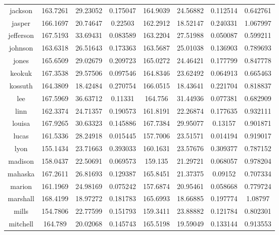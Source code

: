 \begin{table}[H]
\begin{tabular}{|c|ccc|ccc|c|}
jackson       & 163.7261 & 29.23052       & 0.175047 & 164.9039 & 24.56882       & 0.112514 & 0.642761 \\
jasper        & 166.1697 & 20.74647       & 0.22503  & 162.2912 & 18.52147       & 0.240331 & 1.067997 \\
jefferson     & 167.5193 & 33.69431       & 0.083589 & 163.2204 & 27.51988       & 0.050087 & 0.599211 \\
johnson       & 163.6318 & 26.51643       & 0.173363 & 163.5687 & 25.01038       & 0.136903 & 0.789693 \\
jones         & 165.6509 & 29.02679       & 0.209723 & 165.0272 & 24.46421       & 0.177799 & 0.847778 \\
keokuk        & 167.3538 & 29.57506       & 0.097546 & 164.8346 & 23.62492       & 0.064913 & 0.665463 \\
kossuth       & 164.3809 & 18.42484       & 0.270754 & 166.0515 & 18.43641       & 0.221704 & 0.818837 \\
lee           & 167.5969 & 36.63712       & 0.11331  & 164.756  & 31.44936       & 0.077381 & 0.682909 \\
linn          & 162.3374 & 24.71357       & 0.190573 & 161.8191 & 22.26874       & 0.177635 & 0.932111 \\
louisa        & 167.9265 & 30.63323       & 0.145886 & 167.7384 & 29.95077       & 0.13157  & 0.901871 \\
lucas         & 161.5336 & 28.24918       & 0.015445 & 157.7006 & 23.51571       & 0.014194 & 0.919017 \\
lyon          & 155.1434 & 23.71663       & 0.393033 & 160.1631 & 23.57676       & 0.309377 & 0.787152 \\
madison       & 158.0437 & 22.50691       & 0.069573 & 159.135  & 21.29721       & 0.068057 & 0.978204 \\
mahaska       & 167.2611 & 26.81693       & 0.129387 & 165.8451 & 21.37375       & 0.09152  & 0.707334 \\
marion        & 161.1969 & 24.98169       & 0.075242 & 157.6874 & 20.95461       & 0.058668 & 0.779724 \\
marshall      & 168.4199 & 18.97272       & 0.181783 & 165.6993 & 18.66885       & 0.197774 & 1.08797  \\
mills         & 154.7806 & 22.77599       & 0.151793 & 159.3411 & 23.88882       & 0.121784 & 0.802301 \\
mitchell      & 164.789  & 20.02068       & 0.145743 & 165.5198 & 19.59049       & 0.133144 & 0.913553 \\

\end{tabular}
\end{table}
